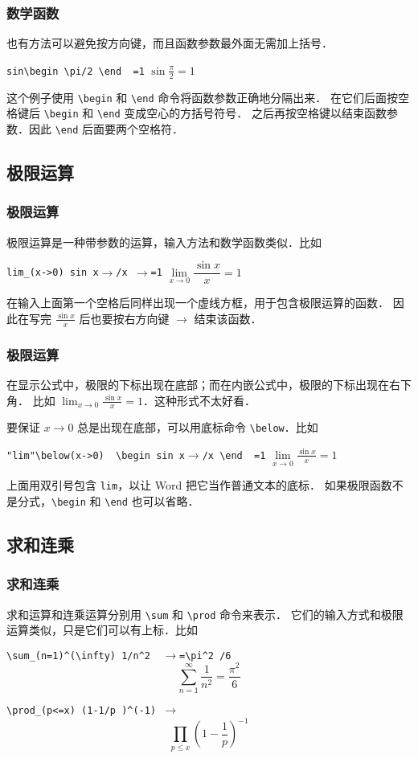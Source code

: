 \documentclass[12pt,notheorems,xcolor={rgb}]{beamer}
\let\lst=\lstinline
\newcommand{\rightkey}{\textcolor{text1!70!back1}{$\rightarrow$}}
\newenvironment{framex}{\begin{frame}[fragile=singleslide,environment=framex]}{\end{frame}}
\def\demo#1{\textcolor{accent3}{#1}}
\begin{document}
\begin{framex}
\frametitle{数学函数}
也有方法可以避免按方向键，而且函数参数最外面无需加上括号．
\begin{exampleh}[0.6]
\lst!sin\begin \pi/2 \end  =1!
\tcblower
$\sin\frac{\pi}{2}=1$
\end{exampleh}
这个例子使用 \lst!\begin! 和 \lst!\end! 命令将函数参数正确地分隔出来．
在它们后面按空格键后 \lst!\begin! 和 \lst!\end! 变成空心的方括号符号．
之后再按空格键以结束函数参数．因此 \lst!\end! 后面要两个空格符．
\end{framex}

\subsection{极限运算}

\begin{framex}
\frametitle{极限运算}
极限运算是一种带参数的运算，输入方法和数学函数类似．比如
\begin{exampleh}[0.65]
\lst!lim_(x->0) sin x!\rightkey\lst!/x !\rightkey\lst!=1!
\tcblower
$\lim\limits_{x\to0}\dfrac{\sin x}{x}=1$
\end{exampleh}
在输入上面第一个空格后同样出现一个虚线方框，用于包含极限运算的函数．
因此在写完 $\frac{\sin x}{x}$ 后也要按右方向键 \rightkey{} 结束该函数．
\end{framex}

\begin{framex}
\frametitle{极限运算}
在显示公式中，极限的下标出现在底部；而在内嵌公式中，极限的下标出现在右下角．
比如 \demo{$\lim_{x\to0}\frac{\sin x}{x}=1$}．这种形式不太好看．
\par
要保证 $x\to0$ 总是出现在底部，可以用底标命令 \lst!\below!．比如
\begin{examplev}
\lst!"lim"\below(x->0)  \begin sin x!\rightkey\lst!/x \end  =1!
\tcblower
$\lim\limits_{x\to0}\tfrac{\sin x}{x}=1$
\end{examplev}
上面用双引号包含 \lst!lim!，以让 Word 把它当作普通文本的底标．
如果极限函数不是分式，\lst!\begin! 和 \lst!\end! 也可以省略．
\end{framex}

\subsection{求和连乘}

\begin{framex}
\frametitle{求和连乘}
求和运算和连乘运算分别用 \lst!\sum! 和 \lst!\prod! 命令来表示．
它们的输入方式和极限运算类似，只是它们可以有上标．比如
\begin{examplev}
\lst!\sum_(n=1)^(\infty) 1/n^2  !\rightkey\lst!=\pi^2 /6 !
\tcblower
$$\sum\limits_{n=1}^{\infty} \dfrac{1}{n^2}  =\dfrac{\pi^2}{6}$$
\end{examplev}
\begin{exampleh}[0.69]
\lst!\prod_(p<=x) (1-1/p )^(-1) !\rightkey
\tcblower
$$\prod\limits_{p\le x}\left(1-\frac1p\right)^{-1}$$
\end{exampleh}
\end{framex}
\end{document}
